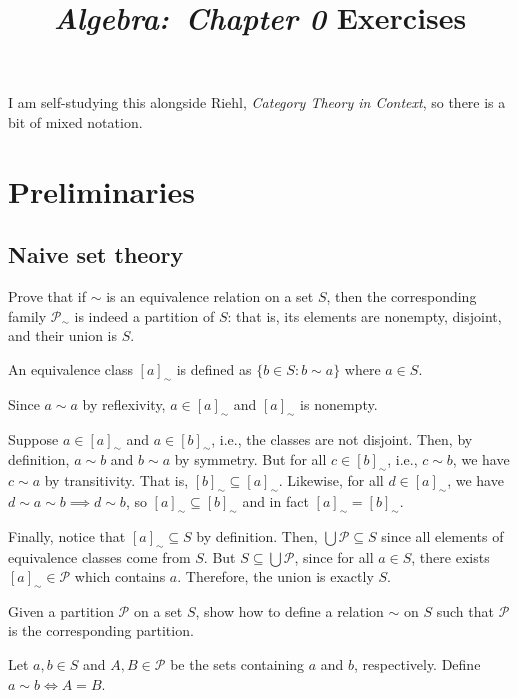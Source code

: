 \documentclass[notes,tikz]{agony}
\title{\emph{Algebra:\ Chapter 0} Exercises}
\begin{document}
\thispagestyle{firstpage}
\renewcommand{\contentsname}{Exercises\\{\Large from Aluffi, \emph{Algebra:\ Chapter 0}}}
\tableofcontents

I am self-studying this alongside Riehl, \emph{Category Theory in Context},
so there is a bit of mixed notation.

\chapter{Preliminaries}

\section{Naive set theory}

\begin{xca}
  Prove that if $\sim$ is an equivalence relation on a set $S$,
  then the corresponding family $\mathscr{P}_\sim$ is indeed a partition of $S$:
  that is, its elements are nonempty, disjoint, and their union is $S$.
\end{xca}
\begin{prf}
  An equivalence class $[a]_\sim$ is defined as $\{b \in S : b \sim a\}$
  where $a \in S$.

  Since $a \sim a$ by reflexivity, $a \in [a]_\sim$ and $[a]_\sim$ is nonempty.

  Suppose $a \in [a]_\sim$ and $a \in [b]_\sim$, i.e., the classes are not disjoint.
  Then, by definition, $a \sim b$ and $b \sim a$ by symmetry.
  But for all $c \in [b]_\sim$, i.e., $c \sim b$,
  we have $c \sim a$ by transitivity.
  That is, $[b]_\sim \subseteq [a]_\sim$.
  Likewise, for all $d \in [a]_\sim$, we have $d \sim a \sim b \implies d \sim b$,
  so $[a]_\sim \subseteq [b]_\sim$ and in fact $[a]_\sim = [b]_\sim$.

  Finally, notice that $[a]_\sim \subseteq S$ by definition.
  Then, $\bigcup \mathscr{P} \subseteq S$
  since all elements of equivalence classes come from $S$.
  But $S \subseteq \bigcup \mathscr{P}$, since for all $a \in S$,
  there exists $[a]_\sim \in \mathscr{P}$ which contains $a$.
  Therefore, the union is exactly $S$.
\end{prf}

\begin{xca}
  Given a partition $\mathscr{P}$ on a set $S$, show how to define a relation $\sim$ on $S$
  such that $\mathscr{P}$ is the corresponding partition.
\end{xca}
\begin{sol}
  Let $a, b \in S$ and $A, B \in \mathscr{P}$ be the sets containing $a$ and $b$, respectively.
  Define $a \sim b \iff A = B$.
\end{sol}
\end{document}
